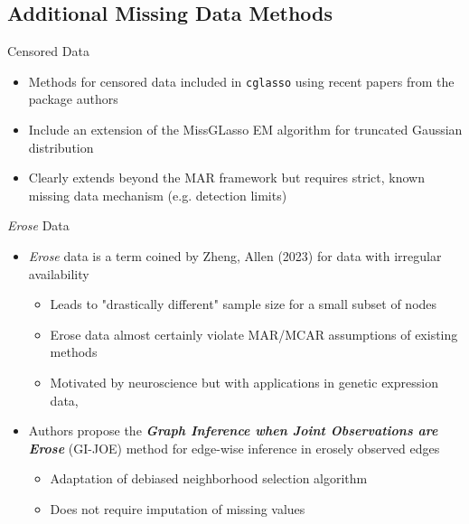 \documentclass{beamer}
\begin{document}
\subsection{Additional Missing Data Methods}

\begin{frame}{Censored Data}
    \begin{itemize}
        \item Methods for censored data included in \texttt{cglasso} using recent papers from the package authors \cite{augugliaro_l1_2018, augugliaro_conditional_2020}
        \item Include an extension of the MissGLasso EM algorithm for truncated Gaussian distribution 
        \item Clearly extends beyond the MAR framework but requires strict, known missing data mechanism (e.g. detection limits)
    \end{itemize}
\end{frame}



\begin{frame}{{\it Erose} Data}
    \begin{itemize}
        \item {\it Erose} data is a term coined by Zheng, Allen (2023) for data with irregular availability \cite{zheng_gi-joe_2023}
        \begin{itemize}
            \item Leads to "drastically different" sample size for a small subset of nodes 
            \item Erose data almost certainly violate MAR/MCAR assumptions of existing methods 
            \item Motivated by neuroscience but with applications in genetic expression data, 
        \end{itemize}
        \item Authors propose the {\it \bf{G}raph \bf{I}nference when \bf{J}oint \bf{O}bservations are \bf{Erose}} (GI-JOE) method for edge-wise inference in erosely observed edges 
        \begin{itemize}
            \item Adaptation of debiased neighborhood selection algorithm 
            \item Does not require imputation of missing values
        \end{itemize}
    \end{itemize} 
\end{frame}
\end{document}
